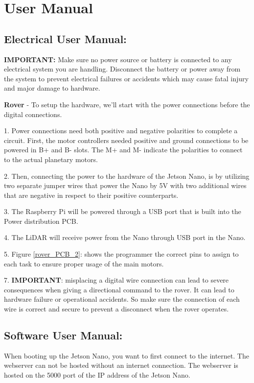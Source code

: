 \documentclass[a4paper, 10pt]{article}
\begin{document}
\section{User Manual}
	\subsection{Electrical User Manual:}

\textbf{IMPORTANT:} Make sure no power source or battery is connected to any electrical system you are handling. Disconnect the battery or power away from the system to prevent electrical failures or accidents which may cause fatal injury and major damage to hardware.  

\textbf{Rover} - To setup the hardware, we'll start with the power connections before the digital connections.

1. Power connections need both positive and negative polarities to complete a circuit. First, the motor controllers needed positive and ground connections to be powered in B+ and B- slots. The M+ and M- indicate the polarities to connect to the actual planetary motors. 

2. Then, connecting the power to the hardware of the Jetson Nano, is by utilizing two separate jumper wires that power the Nano by 5V with two additional wires that are negative in respect to their positive counterparts.  

3. The Raspberry Pi will be powered through a USB port that is built into the Power distribution PCB.

4. The LiDAR will receive power from the Nano through USB port in the Nano.

5. Figure \ref{rover_PCB_2}: shows the programmer the correct pins to assign to each task to ensure proper usage of the main motors.

7. \textbf{IMPORTANT}: misplacing a digital wire connection can lead to severe consequences when giving a directional command to the rover. It can lead to hardware failure or operational accidents. So make sure the connection of each wire is correct and secure to prevent a disconnect when the rover operates.

\subsection{Software User Manual:}
    When booting up the Jetson Nano, you want to first connect to the internet. The webserver can not be hosted without an internet connection. The webserver is hosted on the 5000 port of the IP address of the Jetson Nano. 
    
\end{document}
